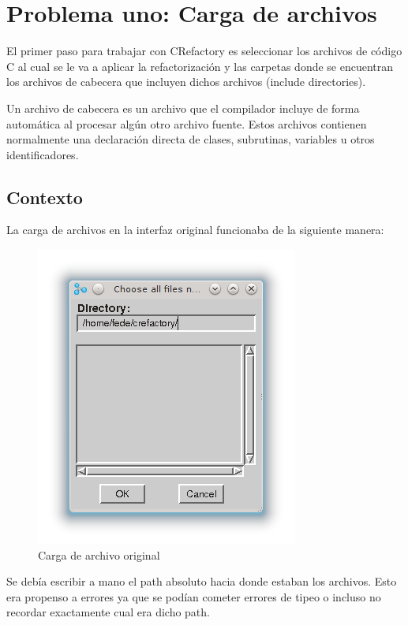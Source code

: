 \documentclass[a4paper,oneside,12pt]{article}
\begin{document}
\section{Problema uno: Carga de archivos}
\label{sec:problemOne}

El primer paso para trabajar con CRefactory es seleccionar los archivos de c\'odigo C al cual se le va a aplicar la refactorizaci\'on y las carpetas donde se encuentran los archivos de cabecera que incluyen dichos archivos (include directories).

Un archivo de cabecera es un archivo que el compilador incluye de forma autom\'atica al procesar alg\'un otro archivo fuente. Estos archivos contienen normalmente una declaraci\'on directa de clases, subrutinas, variables u otros identificadores.


\subsection{Contexto}
La carga de archivos en la interfaz original funcionaba de la siguiente manera:

\begin{figure}[h!]
  \centering
    \includegraphics[scale=0.85]{images/codigo_original/carga.png}
    \caption{Carga de archivo original}
    \label{carga_original}
\end{figure}

Se deb\'ia escribir a mano el path absoluto hacia donde estaban los archivos. Esto era propenso a errores ya que se pod\'ian cometer errores de tipeo o incluso no recordar exactamente cual era dicho path.
\end{document}
